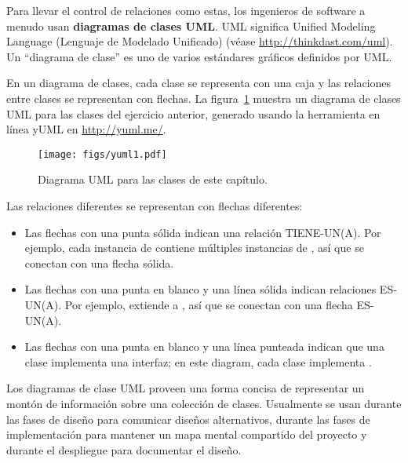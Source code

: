 \documentclass[12pt]{book}
\theoremstyle{exercise}
\begin{document}
Para llevar el control de relaciones como estas, los ingenieros de software
a menudo usan {\bf diagramas de clases UML}. UML significa Unified Modeling
Language (Lenguaje de Modelado Unificado)
(véase \url{http://thinkdast.com/uml}).
Un ``diagrama de clase'' es uno de varios estándares gráficos definidos por UML.

En un diagrama de clases, cada clase se representa con una caja y
las relaciones entre clases se representan con flechas. La
figura~\ref{fig-uml} muestra un diagrama de clases UML para las clases
del ejercicio anterior, generado usando la herramienta en línea yUML en
\url{http://yuml.me/}.

\begin{figure}
\centering
\texttt{[image: figs/yuml1.pdf]}
\caption{Diagrama UML para las clases de este capítulo.}
\label{fig-uml}
\end{figure}


Las relaciones diferentes se representan con flechas diferentes:

\begin{itemize}

\item
  Las flechas con una punta sólida indican una relación TIENE-UN(A). Por ejemplo,
  cada instancia de  contiene múltiples instancias de
  , así que se conectan con una flecha sólida.

\item
  Las flechas con una punta en blanco y una línea sólida indican relaciones
  ES-UN(A). Por ejemplo,  extiende a
  , así que se conectan con una flecha ES-UN(A).

\item
  Las flechas con una punta en blanco y una línea punteada indican que
  una clase implementa una interfaz; en este diagram, cada clase implementa
  .

\end{itemize}

Los diagramas de clase UML proveen una forma concisa de representar un
montón de información sobre una colección de clases. Usualmente se usan
durante las fases de diseño para comunicar diseños alternativos, durante
las fases de implementación para mantener un mapa mental compartido del
proyecto y durante el despliegue para documentar el diseño.
\end{document}
